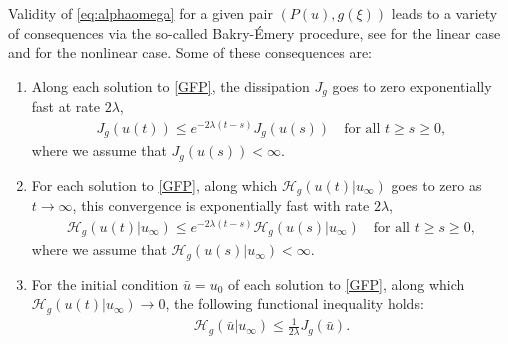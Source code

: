 \documentclass[reqno]{amsart}
\newcommand{\uinf}{u_\infty}
\begin{document}
Validity of \eqref{eq:alphaomega} for a given pair $(P(u),g(\xi))$ leads to a variety of consequences via the so-called Bakry-\'Emery procedure, 
see \cite{BaEm84,BaEm85a,BaEm85,AMTU} for the linear case and \cite{CJMTU} for the nonlinear case. 
Some of these consequences are:
\begin{enumerate}
\item[(a)] Along each solution to \eqref{GFP}, 
  the dissipation $J_g$ goes to zero exponentially fast at rate $2\lambda$,
  \begin{align}\label{mainconclusion1}
    J_g(u(t)) \le e^{-2\lambda(t-s)}J_g(u(s)) \quad \text{for all $t\ge s\ge 0$},
  \end{align}
  where we assume that $J_g(u(s))<\infty$.
\item[(b)] For each solution to \eqref{GFP}, along which ${\mathcal H}_g(u(t)|\uinf)$ goes to zero as $t\to\infty$,
  this convergence is exponentially fast with rate $2\lambda$,
  \begin{align}\label{mainconclusion2}
    {\mathcal H}_g(u(t)|\uinf) \le e^{-2\lambda(t-s)}{\mathcal H}_g(u(s)|\uinf) \quad \text{for all $t\ge s\ge 0$},
  \end{align}
  where we assume that ${\mathcal H}_g(u(s)|\uinf)<\infty$.
\item[(c)] For the initial condition $\bar u=u_0$ of each solution to \eqref{GFP}, along which ${\mathcal H}_g(u(t)|\uinf)\to0$,
  the following functional inequality holds:
  \begin{align}\label{mainconclusion3}
    {\mathcal H}_g(\bar u|\uinf) \le \frac1{2\lambda}J_g(\bar u).
  \end{align}
\end{enumerate}
\end{document}
